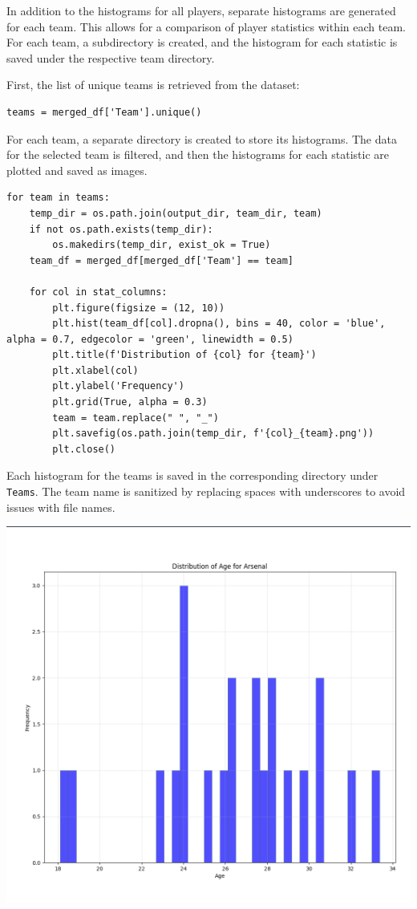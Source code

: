 \documentclass[a4paper,12pt]{article}
\begin{document}
In addition to the histograms for all players, separate histograms are generated for each team. This allows for a comparison of player statistics within each team. For each team, a subdirectory is created, and the histogram for each statistic is saved under the respective team directory.

First, the list of unique teams is retrieved from the dataset:

\begin{verbatim}
teams = merged_df['Team'].unique()
\end{verbatim}

For each team, a separate directory is created to store its histograms. The data for the selected team is filtered, and then the histograms for each statistic are plotted and saved as images.

\begin{verbatim}
for team in teams:
    temp_dir = os.path.join(output_dir, team_dir, team)
    if not os.path.exists(temp_dir):
        os.makedirs(temp_dir, exist_ok = True)
    team_df = merged_df[merged_df['Team'] == team]
    
    for col in stat_columns:
        plt.figure(figsize = (12, 10))
        plt.hist(team_df[col].dropna(), bins = 40, color = 'blue', alpha = 0.7, edgecolor = 'green', linewidth = 0.5)
        plt.title(f'Distribution of {col} for {team}')
        plt.xlabel(col)
        plt.ylabel('Frequency')
        plt.grid(True, alpha = 0.3)
        team = team.replace(" ", "_")
        plt.savefig(os.path.join(temp_dir, f'{col}_{team}.png'))
        plt.close()
\end{verbatim}

Each histogram for the teams is saved in the corresponding directory under \texttt{Teams}. The team name is sanitized by replacing spaces with underscores to avoid issues with file names.

\includegraphics{ars.png}
\end{document}
